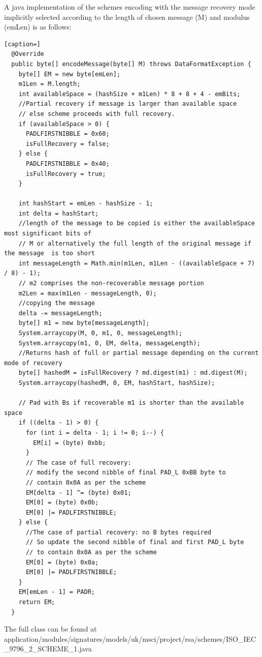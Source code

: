 \documentclass[]{final_report}
\theoremstyle{definition}
\begin{document}
A java implementation of the schemes encoding with the message recovery mode implicitly selected according to the length of chosen message (M) and modulus (emLen) is as follows: 
\begin{lstlisting}[caption=]
  @Override
  public byte[] encodeMessage(byte[] M) throws DataFormatException {
    byte[] EM = new byte[emLen];
    m1Len = M.length;
    int availableSpace = (hashSize + m1Len) * 8 + 8 + 4 - emBits;
    //Partial recovery if message is larger than available space
    // else scheme proceeds with full recovery.
    if (availableSpace > 0) {
      PADLFIRSTNIBBLE = 0x60;
      isFullRecovery = false;
    } else {
      PADLFIRSTNIBBLE = 0x40;
      isFullRecovery = true;
    }

    int hashStart = emLen - hashSize - 1;
    int delta = hashStart;
    //length of the message to be copied is either the availableSpace most significant bits of
    // M or alternatively the full length of the original message if the message  is too short
    int messageLength = Math.min(m1Len, m1Len - ((availableSpace + 7) / 8) - 1);
    // m2 comprises the non-recoverable message portion
    m2Len = max(m1Len - messageLength, 0);
    //copying the message
    delta -= messageLength;
    byte[] m1 = new byte[messageLength];
    System.arraycopy(M, 0, m1, 0, messageLength);
    System.arraycopy(m1, 0, EM, delta, messageLength);
    //Returns hash of full or partial message depending on the current mode of recovery
    byte[] hashedM = isFullRecovery ? md.digest(m1) : md.digest(M);
    System.arraycopy(hashedM, 0, EM, hashStart, hashSize);

    // Pad with Bs if recoverable m1 is shorter than the available space
    if ((delta - 1) > 0) {
      for (int i = delta - 1; i != 0; i--) {
        EM[i] = (byte) 0xbb;
      }
      // The case of full recovery:
      // modify the second nibble of final PAD_L 0xBB byte to
      // contain 0x0A as per the scheme
      EM[delta - 1] ^= (byte) 0x01;
      EM[0] = (byte) 0x0b;
      EM[0] |= PADLFIRSTNIBBLE;
    } else {
      //The case of partial recovery: no B bytes required
      // So update the second nibble of final and first PAD_L byte
      // to contain 0x0A as per the scheme
      EM[0] = (byte) 0x0a;
      EM[0] |= PADLFIRSTNIBBLE;
    }
    EM[emLen - 1] = PADR;
    return EM;
  }
\end{lstlisting}

The full class can be found at application/modules/signatures/models/uk/msci/project/rsa/schemes/ISO\_IEC\_9796\_2\_SCHEME\_1.java
\end{document}
